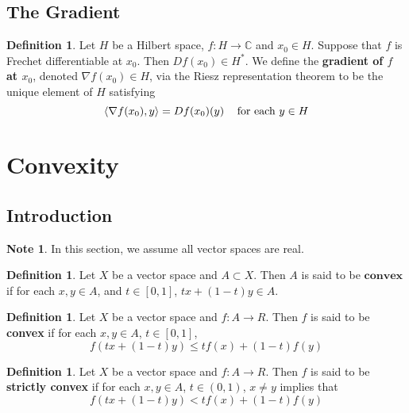 \documentclass[12pt]{amsart}
\theoremstyle{definition}
\newtheorem{defn}[definition]{Definition}
\newtheorem{note}[definition]{Note}
\newcommand{\C}{\mathbb{C}}
\newcommand{\tbf}[1]{\textbf{#1}}
\newcommand{\ui}{[0,1]}
\renewcommand{\r}{\rangle}
\renewcommand{\l}{\langle}
\DeclareMathOperator*{\0}{\mbf{0}}
\DeclareMathOperator*{\1}{\mbf{1}}
\newcommand{\ld}[1]{\label{defn:#1}}
\begin{document}
	
	
	
	
	
	
	\newpage
	\subsection{The Gradient}
	
	\begin{defn} \ld{}
	Let $H$ be a Hilbert space, $f: H \rightarrow \C$ and $x_0 \in H$. Suppose that $f$ is Frechet differentiable at $x_0$. Then $Df(x_0) \in H^*$. We define the \tbf{gradient of $f$ at $x_0$}, denoted $\nabla f(x_0) \in H$, via the Riesz representation theorem to be the unique element of $H$ satisfying $$\l \nabla f(x_0), y \r = Df(x_0)(y) \hspace{.3cm} \text{ for each } y \in H$$
	\end{defn}
	
	
	
	
	
	
	
	
	
	
	

	
	
	
	
	
	
	\newpage
	\section{Convexity}
	
	\subsection{Introduction}

	\begin{note}
	In this section, we assume all vector spaces are real.
	\end{note}

	\begin{defn} \ld{91001}
	Let $X$ be a vector space and $A \subset X$. Then $A$ is said to be $\tbf{convex}$ if for each $x, y \in A$, and $t \in [0,1]$,  $tx + (1-t)y \in A$. 
	\end{defn}	
	
	\begin{defn} \ld{91002}
	Let $X$ be a vector space and $f:A \rightarrow R$. Then $f$ is said to be \tbf{convex} if for each $x,y \in A$, $t \in \ui$, $$f(tx + (1-t)y) \leq tf(x) + (1-t)f(y)$$
	\end{defn}
	
	\begin{defn} \ld{91003}
	Let $X$ be a vector space and $f:A \rightarrow R$. Then $f$ is said to be \tbf{strictly convex} if for each $x,y \in A$, $t \in (0,1)$, $x \neq y$ implies that $$f(tx + (1-t)y) < tf(x) + (1-t)f(y)$$
	\end{defn}
	
\end{document}
